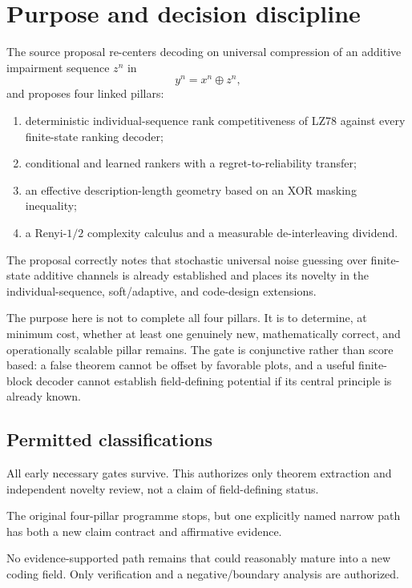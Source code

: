 \documentclass[11pt]{article}
\newcommand{\STOP}{\texttt{STOP\_FIELD\_DEFINING\_ZIV\_PROGRAMME}}
\newcommand{\PIVOT}{\texttt{PIVOT\_TO\_REVISED\_ZIV\_TRACK}}
\newcommand{\CONTINUE}{\texttt{CONTINUE\_FIELD\_DEFINING\_ZIV\_TRACK}}
\begin{document}
\tableofcontents
\newpage

\section{Purpose and decision discipline}

The source proposal re-centers decoding on universal compression of an additive impairment sequence $z^n$ in
\begin{equation}
  y^n=x^n\oplus z^n,
\end{equation}
and proposes four linked pillars:
\begin{enumerate}
  \item deterministic individual-sequence rank competitiveness of LZ78 against every finite-state ranking decoder;
  \item conditional and learned rankers with a regret-to-reliability transfer;
  \item an effective description-length geometry based on an XOR masking inequality;
  \item a Renyi-$1/2$ complexity calculus and a measurable de-interleaving dividend.
\end{enumerate}
The proposal correctly notes that stochastic universal noise guessing over finite-state additive channels is already established and places its novelty in the individual-sequence, soft/adaptive, and code-design extensions.

The purpose here is not to complete all four pillars.  It is to determine, at minimum cost, whether at least one genuinely new, mathematically correct, and operationally scalable pillar remains.  The gate is conjunctive rather than score based: a false theorem cannot be offset by favorable plots, and a useful finite-block decoder cannot establish field-defining potential if its central principle is already known.

\subsection{Permitted classifications}

\begin{description}[leftmargin=2.4em]
\item[\CONTINUE.] All early necessary gates survive.  This authorizes only theorem extraction and independent novelty review, not a claim of field-defining status.
\item[\PIVOT.] The original four-pillar programme stops, but one explicitly named narrow path has both a new claim contract and affirmative evidence.
\item[\STOP.] No evidence-supported path remains that could reasonably mature into a new coding field.  Only verification and a negative/boundary analysis are authorized.
\end{description}
\end{document}
